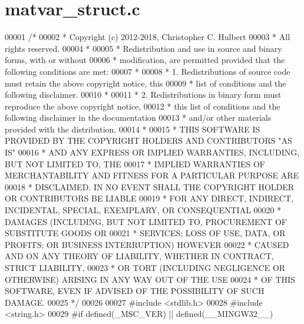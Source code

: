\hypertarget{matvar__struct_8c_source}{}\section{matvar\+\_\+struct.\+c}
\label{matvar__struct_8c_source}

\begin{DoxyCode}
00001 \textcolor{comment}{/*}
00002 \textcolor{comment}{ * Copyright (c) 2012-2018, Christopher C. Hulbert}
00003 \textcolor{comment}{ * All rights reserved.}
00004 \textcolor{comment}{ *}
00005 \textcolor{comment}{ * Redistribution and use in source and binary forms, with or without}
00006 \textcolor{comment}{ * modification, are permitted provided that the following conditions are met:}
00007 \textcolor{comment}{ *}
00008 \textcolor{comment}{ * 1. Redistributions of source code must retain the above copyright notice, this}
00009 \textcolor{comment}{ *    list of conditions and the following disclaimer.}
00010 \textcolor{comment}{ *}
00011 \textcolor{comment}{ * 2. Redistributions in binary form must reproduce the above copyright notice,}
00012 \textcolor{comment}{ *    this list of conditions and the following disclaimer in the documentation}
00013 \textcolor{comment}{ *    and/or other materials provided with the distribution.}
00014 \textcolor{comment}{ *}
00015 \textcolor{comment}{ * THIS SOFTWARE IS PROVIDED BY THE COPYRIGHT HOLDERS AND CONTRIBUTORS "AS IS"}
00016 \textcolor{comment}{ * AND ANY EXPRESS OR IMPLIED WARRANTIES, INCLUDING, BUT NOT LIMITED TO, THE}
00017 \textcolor{comment}{ * IMPLIED WARRANTIES OF MERCHANTABILITY AND FITNESS FOR A PARTICULAR PURPOSE ARE}
00018 \textcolor{comment}{ * DISCLAIMED. IN NO EVENT SHALL THE COPYRIGHT HOLDER OR CONTRIBUTORS BE LIABLE}
00019 \textcolor{comment}{ * FOR ANY DIRECT, INDIRECT, INCIDENTAL, SPECIAL, EXEMPLARY, OR CONSEQUENTIAL}
00020 \textcolor{comment}{ * DAMAGES (INCLUDING, BUT NOT LIMITED TO, PROCUREMENT OF SUBSTITUTE GOODS OR}
00021 \textcolor{comment}{ * SERVICES; LOSS OF USE, DATA, OR PROFITS; OR BUSINESS INTERRUPTION) HOWEVER}
00022 \textcolor{comment}{ * CAUSED AND ON ANY THEORY OF LIABILITY, WHETHER IN CONTRACT, STRICT LIABILITY,}
00023 \textcolor{comment}{ * OR TORT (INCLUDING NEGLIGENCE OR OTHERWISE) ARISING IN ANY WAY OUT OF THE USE}
00024 \textcolor{comment}{ * OF THIS SOFTWARE, EVEN IF ADVISED OF THE POSSIBILITY OF SUCH DAMAGE.}
00025 \textcolor{comment}{ */}
00026 
00027 \textcolor{preprocessor}{#include <stdlib.h>}
00028 \textcolor{preprocessor}{#include <string.h>}
00029 \textcolor{preprocessor}{#if defined(\_MSC\_VER) || defined(\_\_MINGW32\_\_)}

\end{DoxyCode}
